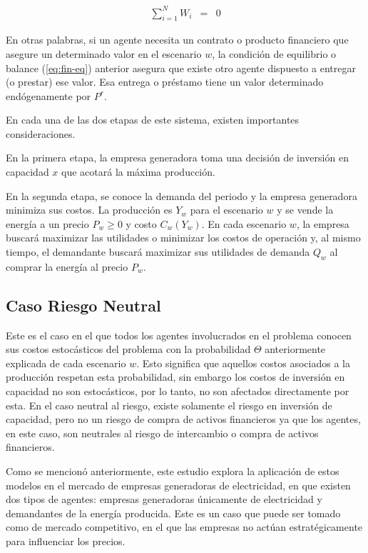 \begin{eqnarray}
\sum_{i=1}^{N}W_{i} &=& 0\label{eq:fin-eq}    
\end{eqnarray}

En otras palabras, si un agente necesita un contrato o producto financiero que asegure un determinado valor en el escenario $w$, la condición de equilibrio o balance (\ref{eq:fin-eq}) anterior asegura que existe otro agente dispuesto a entregar (o prestar) ese valor. Esa entrega o préstamo tiene un valor determinado endógenamente por $P^r$.\vspace{2.5mm}

En cada una de las dos etapas de este sistema, existen importantes consideraciones.
\vspace{2.5mm}

En la primera etapa, la empresa generadora toma una decisión de inversión en capacidad $x$ que acotará la máxima producción. 
\vspace{2.5mm}

En la segunda etapa, se conoce la demanda del periodo y la empresa generadora minimiza sus costos. La producción es $Y_{w}$ para el escenario $w$ y se vende la energía a un precio $P_{w}\geq 0$ y costo $C_{w}(Y_{w})$. En cada escenario $w$, la empresa buscará maximizar las utilidades o minimizar los costos de operación y, al mismo tiempo, el demandante buscará maximizar sus utilidades de demanda $Q_{w}$ al comprar la energía al precio $P_{w}$.

\subsection{Caso Riesgo Neutral}

Este es el caso en el que todos los agentes involucrados en el problema conocen sus costos estocásticos del problema con la probabilidad $\Theta$ anteriormente explicada de cada escenario $w$. Esto significa que aquellos costos asociados a la producción respetan esta probabilidad, sin embargo los costos de inversión en capacidad no son estocásticos, por lo tanto, no son afectados directamente por esta. En el caso neutral al riesgo, existe solamente el riesgo en inversión de capacidad, pero no un riesgo de compra de activos financieros ya que los agentes, en este caso, son neutrales al riesgo de intercambio o compra de activos financieros. 
\vspace{2.5mm}

Como se mencionó anteriormente, este estudio explora la aplicación de estos modelos en el mercado de empresas generadoras de electricidad, en que existen dos tipos de agentes: empresas generadoras únicamente de electricidad y demandantes de la energía producida. Este es un caso que puede ser tomado como de mercado competitivo, en el que las empresas no actúan estratégicamente para influenciar los precios. 
\vspace{2.5mm}

